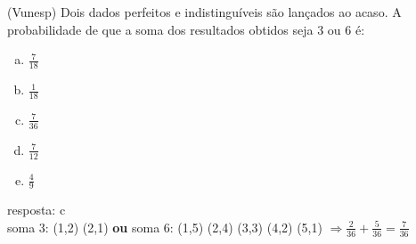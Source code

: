 \begin{ex}
(Vunesp) Dois dados perfeitos e indistinguíveis são lançados ao acaso. A probabilidade de que a soma dos resultados obtidos seja 3 ou 6 é:
   \begin{enumerate}[(a)]
   \item $\frac{7}{18}$
   \item $\frac{1}{18}$
   \item $\frac{7}{36}$
   \item $\frac{7}{12}$
   \item $\frac{4}{9}$
   \end{enumerate}
    \begin{sol}
      resposta: c \\
      soma 3: (1,2) (2,1) \textbf{ou}
      soma 6: (1,5) (2,4) (3,3) (4,2) (5,1) 
      $\Longrightarrow\frac{2}{36}+\frac{5}{36}=\frac{7}{36}$
    \end{sol}
\end{ex}